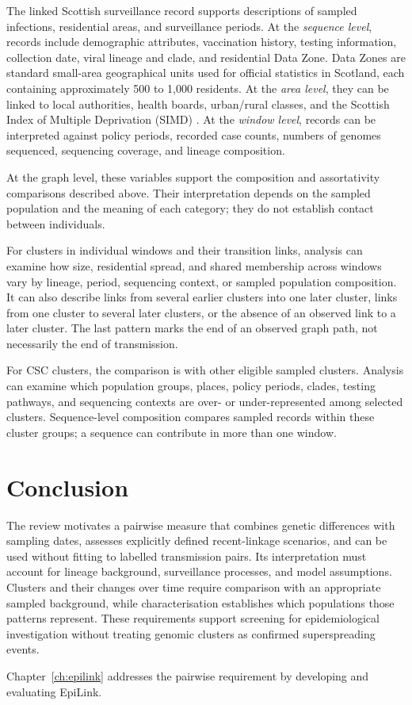 The linked Scottish surveillance record supports descriptions of sampled infections, residential areas, and surveillance periods. At the \emph{sequence level}, records include demographic attributes, vaccination history, testing information, collection date, viral lineage and clade, and residential Data Zone. Data Zones are standard small-area geographical units used for official statistics in Scotland, each containing approximately 500 to 1,000 residents. At the \emph{area level}, they can be linked to local authorities, health boards, urban/rural classes, and the Scottish Index of Multiple Deprivation (SIMD) \citep{ScottishDataZones2022,ScottishSIMD2020,ScottishUrbanRural2020}. At the \emph{window level}, records can be interpreted against policy periods, recorded case counts, numbers of genomes sequenced, sequencing coverage, and lineage composition.

At the graph level, these variables support the composition and assortativity comparisons described above. Their interpretation depends on the sampled population and the meaning of each category; they do not establish contact between individuals.

For clusters in individual windows and their transition links, analysis can examine how size, residential spread, and shared membership across windows vary by lineage, period, sequencing context, or sampled population composition. It can also describe links from several earlier clusters into one later cluster, links from one cluster to several later clusters, or the absence of an observed link to a later cluster. The last pattern marks the end of an observed graph path, not necessarily the end of transmission.

For CSC clusters, the comparison is with other eligible sampled clusters. Analysis can examine which population groups, places, policy periods, clades, testing pathways, and sequencing contexts are over- or under-represented among selected clusters. Sequence-level composition compares sampled records within these cluster groups; a sequence can contribute in more than one window.

\section{Conclusion}\label{sec:ch2_conclusion}

The review motivates a pairwise measure that combines genetic differences with sampling dates, assesses explicitly defined recent-linkage scenarios, and can be used without fitting to labelled transmission pairs. Its interpretation must account for lineage background, surveillance processes, and model assumptions. Clusters and their changes over time require comparison with an appropriate sampled background, while characterisation establishes which populations those patterns represent. These requirements support screening for epidemiological investigation without treating genomic clusters as confirmed superspreading events.

Chapter~\ref{ch:epilink} addresses the pairwise requirement by developing and evaluating EpiLink.
